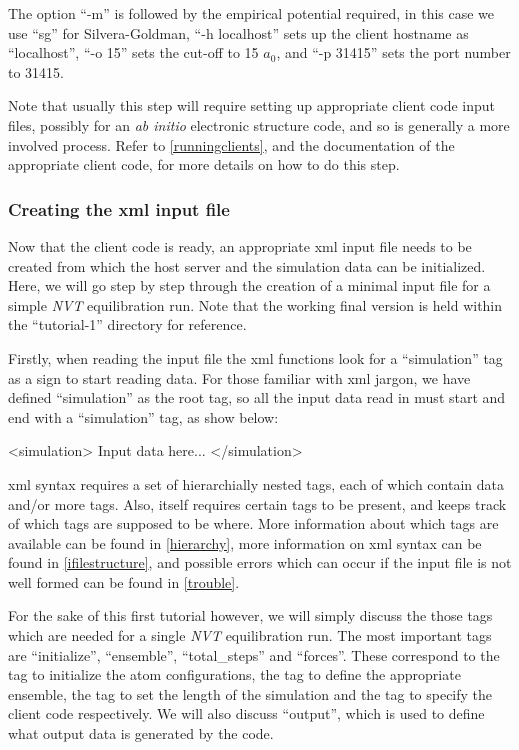 \documentclass[11pt,english,fleqn]{report}
\newenvironment{code}{%
\footnotesize 
\verbatim
}{
\endverbatim
\normalsize
}
\begin{document}
The option {}``-m'' is followed by the empirical potential required,
in this case we use {}``sg'' for Silvera-Goldman, 
{}``-h localhost'' sets up the client hostname
as {}``localhost'', {}``-o 15'' sets the cut-off to 15 \(a_0\), 
and {}``-p 31415'' sets the port number to 31415. 

Note that usually this step will require setting up appropriate
client code input files, possibly for an \emph{ab initio} electronic
structure code, and so is generally a more involved process. Refer
to \ref{runningclients}, and the documentation of the appropriate
client code, for more details on how to do this step.


\subsubsection{Creating the xml input file}

Now that the client code is ready, an appropriate xml input file needs
to be created from which the host server and the simulation data can
be initialized. Here, we will go step by step through the creation
of a minimal input file for a simple \emph{NVT} equilibration run. Note that
the working final version is held within the {}``tutorial-1'' directory
for reference.

Firstly, when reading the input file the \ipi xml functions look
for a {}``simulation''
tag as a sign to start reading data. For those familiar with xml jargon,
we have defined {}``simulation'' as the root tag, so all the input
data read in must start and end with a {}``simulation'' tag, as
show below:

\begin{code}
<simulation>
   Input data here...
</simulation>
\end{code}

xml syntax requires a set of hierarchially nested tags, each of which
contain data and/or more tags. Also, \ipi itself requires certain
tags to be present, and keeps track of which tags are supposed to
be where. More information about which tags are available can be found
in \ref{hierarchy}, more information on xml syntax can be found in
\ref{ifilestructure}, and possible errors which can occur if the
input file is not well formed can be found in \ref{trouble}. 

For the sake of this first tutorial however, we will simply discuss the
those tags which are needed for a single \emph{NVT} equilibration run.
The most important tags are {}``initialize'', {}``ensemble'', 
{}``total\_steps'' and {}``forces''.
These correspond to the tag to initialize the atom configurations,
the tag to define the appropriate ensemble,
the tag to set the length of the simulation and the tag to specify the client code
respectively.
We will also discuss {}``output'', which is used to define what output data
is generated by the code.
\end{document}

